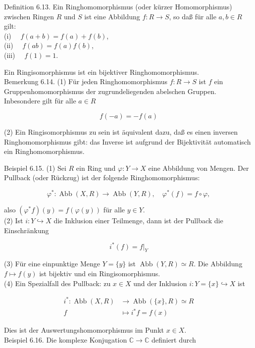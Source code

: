 \documentclass[10pt, letterpaper]{article}
\begin{document}
Definition 6.13. Ein Ringhomomorphismus (oder kürzer Homomorphismus) zwischen Ringen $R$ und $S$ ist eine Abbildung $f: R \rightarrow S$, so daß für alle $a, b \in R$ gilt:\\
(i) $\quad f(a+b)=f(a)+f(b)$,\\
(ii) $\quad f(a b)=f(a) f(b)$,\\
(iii) $\quad f(1)=1$.

Ein Ringisomorphismus ist ein bijektiver Ringhomomorphismus.\\
Bemerkung 6.14. (1) Für jeden Ringhomomorphismus $f: R \rightarrow S$ ist $f$ ein Gruppenhomomorphismus der zugrundeliegenden abelschen Gruppen. Inbesondere gilt für alle $a \in R$

$$
f(-a)=-f(a)
$$

(2) Ein Ringisomorphismus zu sein ist äquivalent dazu, daß es einen inversen Ringhomomorphismus gibt: das Inverse ist aufgrund der Bijektivität automatisch ein Ringhomomorphismus.

Beispiel 6.15. (1) Sei $R$ ein Ring und $\varphi: Y \rightarrow X$ eine Abbildung von Mengen. Der Pullback (oder Rückzug) ist der folgende Ringhomomorphismus:

$$
\varphi^{*}: \operatorname{Abb}(X, R) \rightarrow \operatorname{Abb}(Y, R), \quad \varphi^{*}(f)=f \circ \varphi,
$$

also $\left(\varphi^{*} f\right)(y)=f(\varphi(y))$ für alle $y \in Y$.\\
(2) Ist $i: Y \hookrightarrow X$ die Inklusion einer Teilmenge, dann ist der Pullback die Einschränkung

$$
i^{*}(f)=\left.f\right|_{Y}
$$

(3) Für eine einpunktige Menge $Y=\{y\}$ ist $\operatorname{Abb}(Y, R) \simeq R$. Die Abbildung $f \mapsto f(y)$ ist bijektiv und ein Ringisomorphismus.\\
(4) Ein Spezialfall des Pullback: zu $x \in X$ und der Inklusion $i: Y=\{x\} \hookrightarrow X$ ist

$$
\begin{aligned}
i^{*}: \operatorname{Abb}(X, R) & \rightarrow \operatorname{Abb}(\{x\}, R) \simeq R \\
f & \mapsto i^{*} f=f(x)
\end{aligned}
$$

Dies ist der Auswertungshomomorphismus im Punkt $x \in X$.\\
Beispiel 6.16. Die komplexe Konjugation $\mathbb{C} \rightarrow \mathbb{C}$ definiert durch
\end{document}
